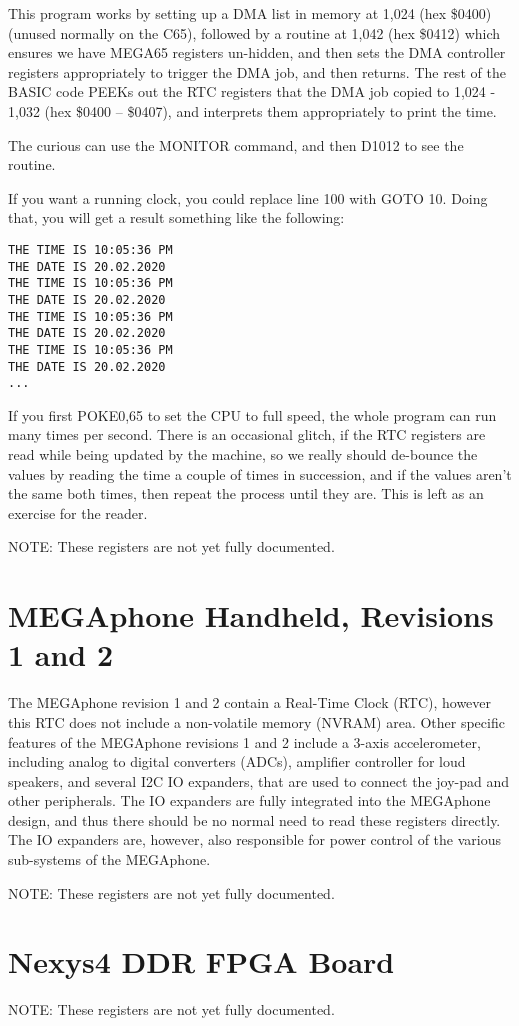 This program works by setting up a DMA list in memory at 1,024 (hex \$0400) (unused normally on the C65), followed by a routine at 1,042 (hex \$0412) which ensures we have MEGA65 registers un-hidden, and then sets the DMA controller registers appropriately to trigger the DMA job, and then returns.  The rest of the BASIC code PEEKs out the RTC registers that the DMA job copied to 1,024 - 1,032 (hex \$0400 -- \$0407), and interprets them appropriately to print the time.

The curious can use the MONITOR command, and then D1012 to see the routine.

If you want a running clock, you could replace line 100 with GOTO 10.  Doing that, you will get a result something like the following:

\begin{tcolorbox}[colback=black,coltext=white]
\verbatimfont{\codefont}
\begin{verbatim}
THE TIME IS 10:05:36 PM
THE DATE IS 20.02.2020
THE TIME IS 10:05:36 PM
THE DATE IS 20.02.2020
THE TIME IS 10:05:36 PM
THE DATE IS 20.02.2020
THE TIME IS 10:05:36 PM
THE DATE IS 20.02.2020
...
\end{verbatim}
\end{tcolorbox}


If you first POKE0,65 to set the CPU to full speed, the whole program can run many times per second. There is an occasional glitch, if the RTC registers are read while being updated by the machine, so we really should de-bounce the values by reading the time a couple of times in succession, and if the values aren't the same both times, then repeat the process until they are. This is left as an exercise for the reader.

NOTE: These registers are not yet fully documented.

%

\section{MEGAphone Handheld, Revisions 1 and 2}

The MEGAphone revision 1 and 2 contain a Real-Time Clock (RTC), however this RTC does not include a non-volatile memory (NVRAM)
area.  Other specific features of the MEGAphone revisions 1 and 2 include a 3-axis accelerometer, including analog to digital
converters (ADCs), amplifier controller for loud speakers, and several I2C IO expanders, that are used to connect the joy-pad and other peripherals. The IO expanders are
fully integrated into the MEGAphone design, and thus there should be no normal need to read these registers directly.  The IO
expanders are, however, also responsible for power control of the various sub-systems of the MEGAphone.

NOTE: These registers are not yet fully documented.

%

\section{Nexys4 DDR FPGA Board}

NOTE: These registers are not yet fully documented.

%


